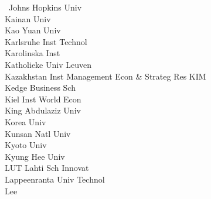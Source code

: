 \documentclass[a4paper]{article}
\begin{document}
\begin{multicols*}{2}
\begin{footnotesize}
\ Johns Hopkins Univ \\ Kainan Univ \\ Kao Yuan Univ \\ Karlsruhe Inst Technol \\ Karolinska Inst \\ Katholieke Univ Leuven \\ Kazakhstan Inst Management Econ \& Strateg Res KIM \\ Kedge Business Sch \\ Kiel Inst World Econ \\ King Abdulaziz Univ \\ Korea Univ \\ Kunsan Natl Univ \\ Kyoto Univ \\ Kyung Hee Univ \\ LUT Lahti Sch Innovat \\ Lappeenranta Univ Technol \\ Lee
\end{footnotesize}
\end{multicols*}
\end{document}
